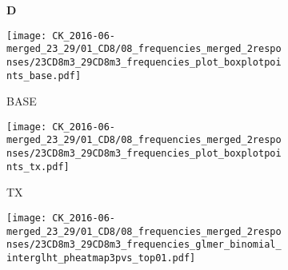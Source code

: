 \documentclass[a4paper, 12pt]{article}
\begin{document}
\begin{figure}[!thb]
\centering

    \caption{Frequencies CD8}
    \begin{subfigure}[t]{0.02\textwidth}
    \vskip 0pt
        \textbf{\textsf{\normalsize D}}
    \end{subfigure}
    \begin{subfigure}[t]{0.45\textwidth}
    \vskip 0pt
    \caption{BASE}
        \texttt{[image: CK\_2016-06-merged\_23\_29/01\_CD8/08\_frequencies\_merged\_2responses/23CD8m3\_29CD8m3\_frequencies\_plot\_boxplotpoints\_base.pdf]}
    \end{subfigure}
    \quad
        \begin{subfigure}[t]{0.02\textwidth}
    \vskip 0pt
        \textbf{\textsf{\normalsize }}
    \end{subfigure}
    \begin{subfigure}[t]{0.45\textwidth}
    \vskip 0pt
    \caption{TX}
        \texttt{[image: CK\_2016-06-merged\_23\_29/01\_CD8/08\_frequencies\_merged\_2responses/23CD8m3\_29CD8m3\_frequencies\_plot\_boxplotpoints\_tx.pdf]}
    \end{subfigure}

    \begin{subfigure}[t]{0.02\textwidth}
    \vskip 0pt
        \textbf{\textsf{\normalsize }}
    \end{subfigure}
    \begin{subfigure}[t]{0.5\textwidth}
    \vskip 0pt
    \caption{}
        \texttt{[image: CK\_2016-06-merged\_23\_29/01\_CD8/08\_frequencies\_merged\_2responses/23CD8m3\_29CD8m3\_frequencies\_glmer\_binomial\_interglht\_pheatmap3pvs\_top01.pdf]}
    \end{subfigure}


\end{figure}
\end{document}
